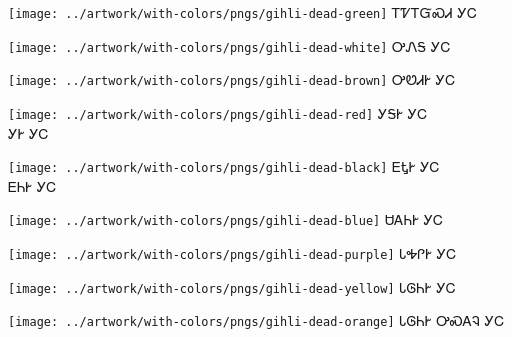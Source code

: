 \documentclass[avery5371]{flashcards}%
\begin{document}
\begin{flashcard}{
\texttt{[image: ../artwork/with-colors/pngs/gihli-dead-green]}
}\Huge ᎢᏤᎢᏳᏍᏗ ᎩᏟ
\end{flashcard}

\begin{flashcard}{
\texttt{[image: ../artwork/with-colors/pngs/gihli-dead-white]}
}\Huge ᎤᏁᎦ ᎩᏟ
\end{flashcard}

\begin{flashcard}{
\texttt{[image: ../artwork/with-colors/pngs/gihli-dead-brown]}
}\Huge ᎤᏬᏗᎨ ᎩᏟ
\end{flashcard}

\begin{flashcard}{
\texttt{[image: ../artwork/with-colors/pngs/gihli-dead-red]}
}\Huge ᎩᎦᎨ ᎩᏟ\\ᎩᎨ ᎩᏟ
\end{flashcard}

\begin{flashcard}{
\texttt{[image: ../artwork/with-colors/pngs/gihli-dead-black]}
}\Huge ᎬᎿᎨ ᎩᏟ\\ᎬᏂᎨ ᎩᏟ
\end{flashcard}

\begin{flashcard}{
\texttt{[image: ../artwork/with-colors/pngs/gihli-dead-blue]}
}\Huge ᏌᎪᏂᎨ ᎩᏟ
\end{flashcard}

\begin{flashcard}{
\texttt{[image: ../artwork/with-colors/pngs/gihli-dead-purple]}
}\Huge ᏓᎭᎵᎨ ᎩᏟ
\end{flashcard}

\begin{flashcard}{
\texttt{[image: ../artwork/with-colors/pngs/gihli-dead-yellow]}
}\Huge ᏓᎶᏂᎨ ᎩᏟ
\end{flashcard}

\begin{flashcard}{
\texttt{[image: ../artwork/with-colors/pngs/gihli-dead-orange]}
}\Huge ᏓᎶᏂᎨ ᎤᏍᎪᎸ ᎩᏟ
\end{flashcard}
\end{document}
